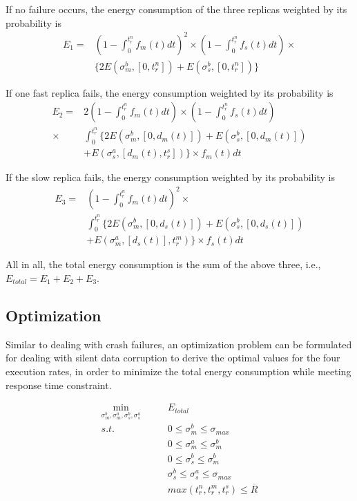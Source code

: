 If no failure occurs, the energy consumption of the three replicas weighted by its probability is
\begin{equation}
\begin{split}
E_1 = & (1 - \int_{0}^{t_r^n} f_m(t)dt)^2 \times (1 - \int_{0}^{t_r^n} f_s(t)dt) \times \\
      & \{2E(\sigma_m^b, [0, t_r^n])+E(\sigma_s^b, [0, t_r^n])\}
\end{split}
\end{equation}

If one fast replica fails, the energy consumption weighted by its probability is 
\begin{equation}
\begin{split}
E_2 = & 2(1 - \int_{0}^{t_r^n} f_m(t)dt) \times 
(1 - \int_{0}^{t_r^n} f_s(t)dt) \\ \times  & \int_{0}^{t_r^n}                \{2E(\sigma_m^b, [0, d_m(t)]) + E(\sigma_s^b, [0,  d_m(t)])  \\
& + E(\sigma_s^a, [d_m(t), t_r^s])  \} \times  f_m(t)dt
\end{split}
\end{equation}

If the slow replica fails, the energy consumption weighted by its probability is 
\begin{equation}
\begin{split}
E_3 = & (1 - \int_{0}^{t_r^n} f_m(t)dt)^2 \times   \\  & \int_{0}^{t_r^n} \{2E(\sigma_m^b, [0, d_s(t)])+E(\sigma_s^b, [0, d_s(t)]) \\ & + E(\sigma_m^a, [d_s(t)], t_r^m)\} \times f_s(t)dt 
\end{split}
\end{equation}

All in all, the total energy consumption is the sum of the above three, i.e., $E_{total}=E_1 + E_2 + E_3$. 

\subsection{Optimization}
Similar to dealing with crash failures, an optimization problem can be formulated for dealing with silent data corruption to derive the optimal values for the four execution rates, in order to minimize the total energy consumption while meeting response time constraint. 

\begin{equation}
\begin{alignedat}{2}
\min_{\sigma_m^b,\sigma_m^a,\sigma_s^b,\sigma_s^a} \qquad  & E_{total} \\
s.t.  \qquad          & 0 \leq \sigma_m^b \leq \sigma_{max} \\
					  & 0 \leq \sigma_m^a \leq \sigma_m^b \\
                      & 0 \leq \sigma_s^b \leq \sigma_m^b \\
                      & \sigma_s^b \leq \sigma_s^a \leq \sigma_{max} \\
                      & max(t_r^n,t_r^m, t_r^s) \leq \overline{R}
\end{alignedat}
\end{equation}

